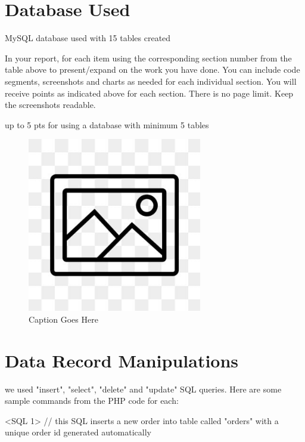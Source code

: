 \documentclass[12pt, letterpaper]{article}
\begin{document}
\section{Database Used}
MySQL database used with 15 tables created

In your report, for each item using the corresponding section number from the table above to present/expand on the work you have done. You can include code segments, screenshots and charts as needed for each individual section. You will receive points as indicated above for each section. There is no page limit. Keep the screenshots readable.

up to 5 pts for using a database with minimum 5 tables

\begin{figure}[htbp]
	\centering
	\includegraphics[width=3in]{images/placeholder.jpg}
	\caption{Caption Goes Here}
 \end{figure}

 \newpage

\section{Data Record Manipulations}
we used "insert", "select", "delete" and "update" SQL queries. Here are some sample commands from the PHP code for each:

<SQL 1> // this SQL inserts a new order into table called "orders" with a unique order id generated automatically
\end{document}
